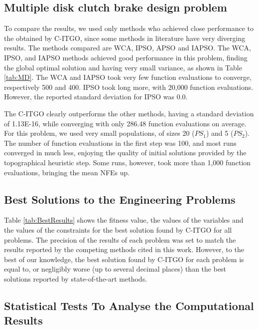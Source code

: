 \subsection{Multiple disk clutch brake design problem}




To compare the results, we used only methods who achieved close performance to the obtained by C-ITGO, since some methods in literature have very diverging results. The methods compared are WCA, IPSO, APSO and IAPSO. The WCA, IPSO, and IAPSO methods achieved good performance in this problem, finding the global optimal solution and having very small variance, as shown in Table \ref{tab:MD}. The WCA and IAPSO took very few function evaluations to converge, respectively 500 and 400. IPSO took long more, with 20,000 function evaluations. However, the reported standard deviation for IPSO was 0.0.



The C-ITGO clearly outperforms the other methods, having a standard deviation of 1.13E-16, while converging with only 286.48 function evaluations on average. For this problem, we used very small populations, of sizes 20 ($PS_1$) and 5 ($PS_2$). The number of function evaluations in the first step was 100, and most runs converged in much less, enjoying the quality of initial solutions provided by the topographical heuristic step. Some runs, however, took more than 1,000 function evaluations, bringing the mean NFEs up.



\subsection{Best Solutions to the Engineering Problems}

Table \ref{tab:BestResults} shows the fitness value, the values of the variables and the values of the constraints for the best solution found by C-ITGO for all problems. The precision of the results of each problem was set to match the results reported by the competing methods cited in this work. However, to the best of our knowledge, the best solution found by C-ITGO for each problem is equal to, or negligibly worse (up to several decimal places) than the best solutions reported by state-of-the-art methods.




\subsection{Statistical Tests To Analyse the Computational Results}

